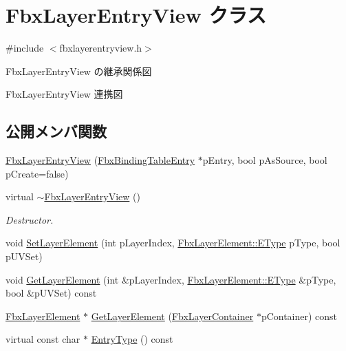 \hypertarget{class_fbx_layer_entry_view}{}\section{Fbx\+Layer\+Entry\+View クラス}
\label{class_fbx_layer_entry_view}


{\ttfamily \#include $<$fbxlayerentryview.\+h$>$}



Fbx\+Layer\+Entry\+View の継承関係図


Fbx\+Layer\+Entry\+View 連携図
\subsection*{公開メンバ関数}
\begin{DoxyCompactItemize}
\item 
\hyperlink{class_fbx_layer_entry_view_a7c5fc0472d0b3d60d0207acc80751daf}{Fbx\+Layer\+Entry\+View} (\hyperlink{class_fbx_binding_table_entry}{Fbx\+Binding\+Table\+Entry} $\ast$p\+Entry, bool p\+As\+Source, bool p\+Create=false)
\item 
virtual \hyperlink{class_fbx_layer_entry_view_abe013d4f54533ea6e71ab784ca73056b}{$\sim$\+Fbx\+Layer\+Entry\+View} ()
\begin{DoxyCompactList}\small\item\em Destructor. \end{DoxyCompactList}\item 
void \hyperlink{class_fbx_layer_entry_view_ae3eaf64e7fdcb66e750ec72627589fdf}{Set\+Layer\+Element} (int p\+Layer\+Index, \hyperlink{class_fbx_layer_element_a8c95c5cd880b56c776acd379bd86f42c}{Fbx\+Layer\+Element\+::\+E\+Type} p\+Type, bool p\+U\+V\+Set)
\item 
void \hyperlink{class_fbx_layer_entry_view_a7301db4c7de8b6ac87ba458f9f216a79}{Get\+Layer\+Element} (int \&p\+Layer\+Index, \hyperlink{class_fbx_layer_element_a8c95c5cd880b56c776acd379bd86f42c}{Fbx\+Layer\+Element\+::\+E\+Type} \&p\+Type, bool \&p\+U\+V\+Set) const
\item 
\hyperlink{class_fbx_layer_element}{Fbx\+Layer\+Element} $\ast$ \hyperlink{class_fbx_layer_entry_view_a6350eba678ba5911cd536f0ed9d740a6}{Get\+Layer\+Element} (\hyperlink{class_fbx_layer_container}{Fbx\+Layer\+Container} $\ast$p\+Container) const
\item 
virtual const char $\ast$ \hyperlink{class_fbx_layer_entry_view_a283d8f57e186dd36c88589dc3f37a35e}{Entry\+Type} () const
\end{DoxyCompactItemize}
